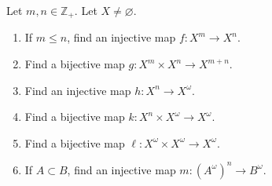 \begin{exercise}\label{chapter1:section5:exercise4}
    Let $m, n\in\mathbb{Z}_{+}$. Let $X\ne \varnothing$.
    \begin{enumerate}[label={(\alph*)}]
        \item If $m\leq n$, find an injective map $f: X^{m}\to X^{n}$.
        \item Find a bijective map $g: X^{m}\times X^{n}\to X^{m+n}$.
        \item Find an injective map $h: X^{n}\to X^{\omega}$.
        \item Find a bijective map $k: X^{n}\times X^{\omega}\to X^{\omega}$.
        \item Find a bijective map $\ell: X^{\omega}\times X^{\omega}\to X^{\omega}$.
        \item If $A\subset B$, find an injective map $m: {(A^{\omega})}^{n}\to B^{\omega}$.
    \end{enumerate}
\end{exercise}


